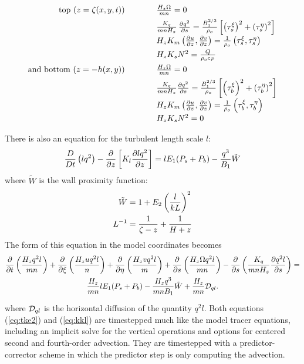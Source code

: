 \[
\begin{array}{rl}
  \mbox{top ($z = \zeta(x,y,t))$} \hspace{1cm}
  & {H_z \Omega \over mn} = 0 \\ [1.5mm]
  & {K_q \over mn H_z} \, \frac{\partial q^2}{\partial s}
    = {B_1^{2/3} \over \rho_o} \left[ \left( \tau_s^\xi \right)^2
    + \left( \tau_s^\eta \right)^2  \right] \\ [1.5mm]
  & H_z K_m \left( {\partial u \over \partial z},
    {\partial v \over \partial z} \right) = {1 \over \rho_o}
    \left( \tau_s^\xi, \tau_s^\eta \right) \\ [1.5mm]
  & H_z K_s N^2 = {Q \over \rho_o c_P} \\[2mm]
  \mbox{and bottom ($z = -h(x,y)$)} \hspace{1cm} &
    {H_z \Omega \over mn} = 0 \\[1.5mm]
  & {K_q \over mnH_z} {\partial q^2 \over \partial s}
    = {B_1^{2/3} \over \rho_o} \left[ \left( \tau_b^\xi \right)^2
    + \left( \tau_b^\eta \right)^2  \right] \\ [1.5mm]
  & H_z K_m \left( {\partial u \over \partial z},
    {\partial v \over \partial z} \right) = {1 \over \rho_o}
    \left( \tau_b^\xi, \tau_b^\eta \right) \\ [1.5mm]
  & H_z K_s N^2 = 0
\end{array}
\]

There is also an equation for the turbulent length scale $l$:
\begin{equation}
  {D \over Dt} \left( {lq^2} \right) -
  {\partial \over \partial z} \left[ K_l
  {\partial lq^2 \over \partial z} 
  \right] = lE_1 ( P_s + P_b ) - {q^3 \over B_1} \tilde{W}
\end{equation}
where $\tilde{W}$ is the wall proximity function:
\begin{align}
  \tilde{W} &= 1 + E_2 \left( {l \over kL} \right) ^2 \\
  L^{-1} &= {1 \over \zeta -z} + {1 \over H+z}
\end{align}
The form of this equation in the model coordinates becomes
\begin{multline}
  {\partial \over \partial t} \left( {H_z q^2l \over mn} \right) +
  {\partial \over \partial \xi} \left( {H_z u q^2l \over n} \right) +
  {\partial \over \partial \eta} \left( {H_z v q^2l \over m} \right) +
  {\partial \over \partial s} \left( {H_z \Omega q^2l \over mn} \right) -
  {\partial \over \partial s} \left( {K_q \over mnH_z}
  {\partial q^2l \over \partial s} \right) =
\\ \vspace{1mm}
  {H_z \over mn} lE_1 ( P_s + P_b) - 
  {H_z q^3 \over mnB_1 } \tilde{W} +
  {H_z \over mn} {\cal D}_{ql} .
  \label{eq:kkl}
\end{multline}
where ${\cal D}_{ql}$ is the horizontal diffusion of the quantity
$q^2l$. Both equations (\ref{eq:tke2}) and (\ref{eq:kkl}) are timestepped
much like the model tracer equations, including an implicit solve for
the vertical operations and options for centered second and fourth-order
advection. They are timestepped with a predictor-corrector scheme in
which the predictor step is only computing the advection.

